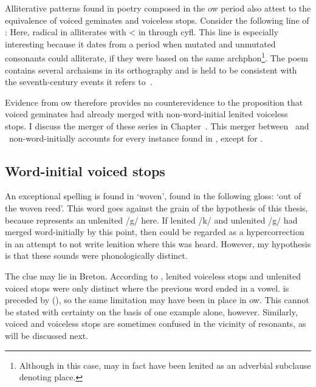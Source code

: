 Alliterative patterns found in poetry composed in the \gls{ow} period also attest to the equivalence of voiced geminates and voiceless stops. Consider the following line of :
Here, radical  in  alliterates with  <  in  through \gls{cyfl}. This line is especially interesting because it dates from a period when mutated and unmutated consonants could alliterate, if they were based on the same \gls{archphon}\footnote{Although in this case,  may in fact have been lenited as an adverbial subclause denoting place.}. The poem contains several archaisms in its orthography and is held to be consistent with the seventh-century events it refers to~\autocite[186--187]{koch_cunedda_2013}.

Evidence from \gls{ow} therefore provides no counterevidence to the proposition that voiced geminates had already merged with non-word-initial lenited voiceless stops. 
I discuss the merger of these series in Chapter~.
This merger between \lT\ and \xD\ non-word-initially accounts for every instance found in , except for .



\subsection{Word-initial voiced stops}
An exceptional spelling is found in  `woven', found in  the following gloss:  `out of the woven reed'. This word goes against the grain of the hypothesis of this thesis, because  represents an unlenited /g/ here. If lenited /k/ and unlenited /g/ had merged word-initially by this point, then  could be regarded as a hypercorrection in an attempt to not write lenition where this was heard. However, my hypothesis is that these sounds were phonologically distinct. 

The clue may lie in Breton. According to \textcite[64]{falchun_systeme_1951}, lenited voiceless stops and unlenited voiced stops were only distinct where the previous word ended in a vowel.  is preceded by  (), so the same limitation may have been in place in \Gls{ow}. This cannot be stated with certainty on the basis of one example alone, however. Similarly, voiced and voiceless stops are sometimes confused in the vicinity of resonants, as will be discussed next. 

